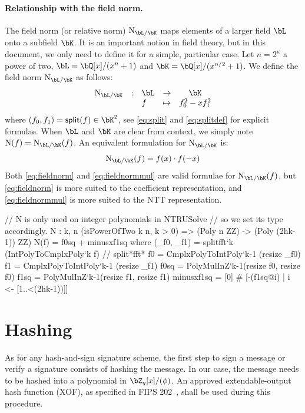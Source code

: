  \paragraph{Relationship with the field norm.} The field norm (or relative norm) $\N_{\bL/\bK}$ maps elements of a larger field $\bL$ onto a subfield $\bK$. It is an important notion in field theory, but in this document, we only need to define it for a simple, particular case. Let $n = 2^\kappa$ a power of two, $\bL = \bQ[x]/(x^{n} + 1)$ and $\bK = \bQ[x]/(x^{n/2} + 1)$. We define the field norm $\N_{\bL/\bK}$ as follows:
 \begin{equation}\label{eq:fieldnorm}
 \begin{array}{llllc}
 \N_{\bL/\bK} & : & \bL & \rightarrow & \bK \\
 & & f & \mapsto & f_0^2 - x f_1^2
 \end{array}
 \end{equation}
 where $(f_0,f_1) = \polsplit(f) \in \bK^2$, see \eqref{eq:split} and \eqref{eq:splitdef} for explicit formulae. When $\bL$ and $\bK$ are clear from context, we simply note $\N(f) = \N_{\bL/\bK}(f)$. An equivalent formulation for $\N_{\bL/\bK}$ is:
 \begin{equation}\label{eq:fieldnormmul}
 \N_{\bL/\bK} (f) = f(x) \cdot f(-x)
 \end{equation}
 Both \eqref{eq:fieldnorm} and \eqref{eq:fieldnormmul} are valid formulae for $\N_{\bL/\bK}(f)$, but \eqref{eq:fieldnorm} is more suited to the coefficient representation, and \eqref{eq:fieldnormmul} is more suited to the NTT representation.

\begin{code}
  // N is only used on integer polynomials in NTRUSolve
  // so we set its type accordingly.
  N : {k, n} (isPowerOfTwo k n, k > 0) =>
    (Poly n ZZ) -> (Poly (2^^(k-1)) ZZ)
  N(f) = f0sq + minusxf1sq where
    (_f0, _f1) = splitfft`{k} (IntPolyToCmplxPoly`{k} f) // split*fft*
    f0 = CmplxPolyToIntPoly`{k-1} (resize _f0)
    f1 = CmplxPolyToIntPoly`{k-1} (resize _f1)
    f0sq = PolyMulInZ`{k-1}(resize f0, resize f0)
    f1sq = PolyMulInZ`{k-1}(resize f1, resize f1)
    minusxf1sq = [0] # [-(f1sq@i) | i <- [1..<(2^^(k-1))]]
\end{code}

 \section{Hashing} \label{sec:spec:hash}

As for any hash-and-sign signature scheme, the first step to sign a message or verify a signature consists of hashing the message. In our case, the message needs to be hashed into a polynomial in $\bZ_q[x]/(\phi)$. An approved extendable-output hash function (XOF), as specified in FIPS 202~\cite{FIPS}, shall be used during this procedure.

